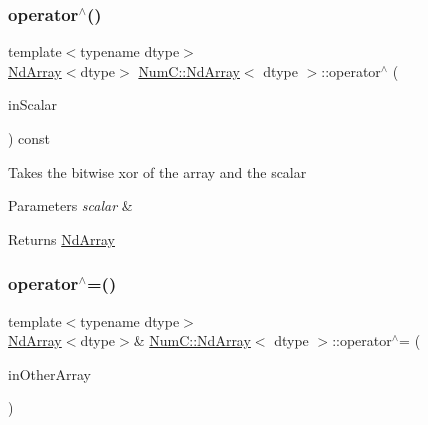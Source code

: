 \subsubsection{\texorpdfstring{operator$^\wedge$()}{operator^()}\hspace{0.1cm}{\footnotesize\ttfamily [2/2]}}
{\footnotesize\ttfamily template$<$typename dtype$>$ \\
\mbox{\hyperlink{class_num_c_1_1_nd_array}{Nd\+Array}}$<$dtype$>$ \mbox{\hyperlink{class_num_c_1_1_nd_array}{Num\+C\+::\+Nd\+Array}}$<$ dtype $>$\+::operator$^\wedge$ (\begin{DoxyParamCaption}\item[{dtype}]{in\+Scalar }\end{DoxyParamCaption}) const\hspace{0.3cm}{\ttfamily [inline]}}

Takes the bitwise xor of the array and the scalar


\begin{DoxyParams}{Parameters}
{\em scalar} & \\
\hline
\end{DoxyParams}
\begin{DoxyReturn}{Returns}
\mbox{\hyperlink{class_num_c_1_1_nd_array}{Nd\+Array}} 
\end{DoxyReturn}
\mbox{\label{class_num_c_1_1_nd_array_aef02ef824dbc1fc46eea2273eb7ec063}} 
\subsubsection{\texorpdfstring{operator$^\wedge$=()}{operator^=()}\hspace{0.1cm}{\footnotesize\ttfamily [1/2]}}
{\footnotesize\ttfamily template$<$typename dtype$>$ \\
\mbox{\hyperlink{class_num_c_1_1_nd_array}{Nd\+Array}}$<$dtype$>$\& \mbox{\hyperlink{class_num_c_1_1_nd_array}{Num\+C\+::\+Nd\+Array}}$<$ dtype $>$\+::operator$^\wedge$= (\begin{DoxyParamCaption}\item[{const \mbox{\hyperlink{class_num_c_1_1_nd_array}{Nd\+Array}}$<$ dtype $>$ \&}]{in\+Other\+Array }\end{DoxyParamCaption})\hspace{0.3cm}{\ttfamily [inline]}}

